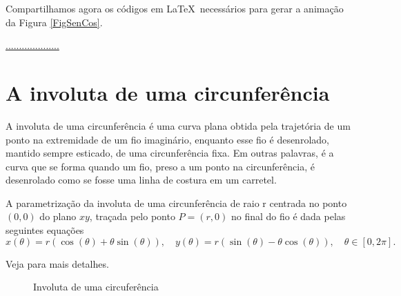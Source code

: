 \documentclass[10pt]{article}
\theoremstyle{plain} %
\theoremstyle{definition} %
\theoremstyle{remark} %
\begin{document}
Compartilhamos agora os códigos em  \LaTeX\ necessários para gerar a animação da Figura \ref{FigSenCos}.



\href{.................}{....................}



\section{A involuta de uma circunferência}\label{SecInvoluta}

\begin{definition}
A involuta de uma circunferência é uma curva plana obtida pela trajetória de um ponto na extremidade de um fio imaginário, enquanto esse fio é desenrolado, mantido sempre esticado, de uma circunferência fixa. Em outras palavras, é a curva que se forma quando um fio, preso a um ponto na circunferência, é desenrolado como se fosse uma linha de costura em um carretel.     
\end{definition}


\begin{theorem}
A parametrização da involuta de uma circunferência de raio r centrada no ponto $(0,0)$ do plano $xy$, traçada pelo ponto $P=(r,0)$ no final do fio é dada pelas seguintes equações
\[
x(\theta)=r(\cos(\theta)+\theta\sin(\theta)),\quad y(\theta)=r(\sin(\theta)-\theta\cos(\theta)),\quad \theta\in[0,2\pi].
\]
\end{theorem}

Veja \cite{ASN} para mais detalhes.


\begin{figure}[!htp]
\centering
\begin{animateinline}[poster = last, controls]{10}
\newframe
{}
\newframe
\end{animateinline}
\caption{Involuta de uma circuferência}
\label{FigInv}
\end{figure}
\end{document}

